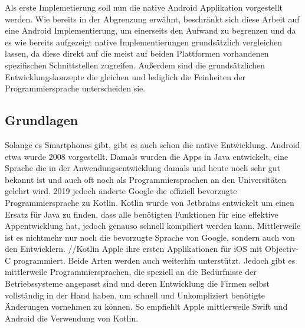Als erste Implemetierung soll nun die native Android Applikation vorgestellt werden. Wie bereits in der Abgrenzung erwähnt, beschränkt sich diese Arbeit auf eine Android Implementierung, um einerseits den Aufwand zu begrenzen und da es wie bereits aufgezeigt native Implementierungen grundsätzlich vergleichen lassen, da diese direkt auf die meist auf beiden Plattformen vorhandenen spezifischen Schnittstellen zugreifen. Außerdem sind die grundsätzlichen Entwicklungskonzepte die gleichen und lediglich die Feinheiten der Programmiersprache unterscheiden sie.

\subsection{Grundlagen}
Solange es Smartphones gibt, gibt es auch schon die native Entwicklung. Android etwa wurde 2008 vorgestellt. Damals wurden die Apps in Java entwickelt, eine Sprache die in der Anwendungsentwicklung damals und heute noch sehr gut bekannt ist und auch oft noch als Programmiersprachen an den Universitäten gelehrt wird. 2019 jedoch änderte Google die offiziell bevorzugte Programmiersprache zu Kotlin. Kotlin wurde von Jetbrains entwickelt um einen Ersatz für Java zu finden, dass alle benötigten Funktionen für eine effektive Appentwicklung hat, jedoch genauso schnell kompiliert werden kann. Mittlerweile ist es nichtmehr nur noch die bevorzugte Sprache von Google, sondern auch von den Entwicklern. //Kotlin Apple ihre ersten Applikationen für iOS mit Objectiv-C programmiert. Beide Arten werden auch weiterhin unterstützt. Jedoch gibt es mittlerweile Programmiersprachen, die speziell an die Bedürfnisse der Betriebssysteme angepasst sind und deren Entwicklung die Firmen selbst vollständig in der Hand haben, um schnell und Unkompliziert benötigte Änderungen vornehmen zu können. So empfiehlt Apple mittlerweile Swift und Android die Verwendung von Kotlin.

